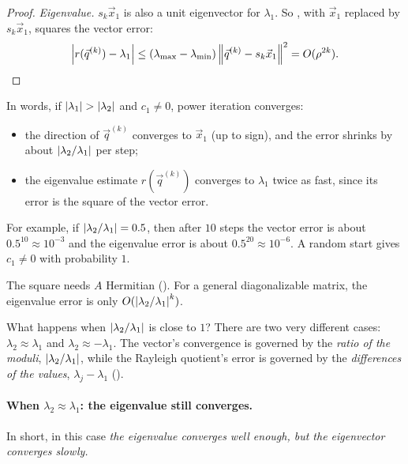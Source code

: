 \begin{proof}
  \emph{Eigenvalue.} $s_k\vec{x}_1$ is also a unit eigenvector for $\lambda_1$. So , with $\vec{x}_1$ replaced by $s_k\vec{x}_1$, squares the vector error:
  \begin{equation*}
    \left\lvert r(\vec{q}^{(k)}) - \lambda_1 \right\rvert \le (\lambda_{\max} - \lambda_{\min})\left\lVert \vec{q}^{(k)} - s_k\vec{x}_1 \right\rVert^2 = O(\rho^{2k}). \qedhere
  \end{equation*}
\end{proof}

In words, if $\left\lvert \lambda_1 \right\rvert > \left\lvert \lambda_2 \right\rvert$ and $c_1 \ne 0$, power iteration converges:
\begin{itemize}
  \item the direction of $\vec{q}^{(k)}$ converges to $\vec{x}_1$ (up to sign), and the error shrinks by about $\left\lvert \lambda_2/\lambda_1 \right\rvert$ per step;
  \item the eigenvalue estimate $r(\vec{q}^{(k)})$ converges to $\lambda_1$ twice as fast, since its error is the square of the vector error.
\end{itemize}
For example, if $\left\lvert \lambda_2/\lambda_1 \right\rvert = 0.5$, then after $10$ steps the vector error is about $0.5^{10} \approx 10^{-3}$ and the eigenvalue error is about $0.5^{20} \approx 10^{-6}$. A random start gives $c_1 \ne 0$ with probability $1$.

The square needs $A$ Hermitian (). For a general diagonalizable matrix, the eigenvalue error is only $O(\left\lvert \lambda_2/\lambda_1 \right\rvert^k)$.

What happens when $\left\lvert \lambda_2/\lambda_1 \right\rvert$ is close to $1$? There are two very different cases: $\lambda_2 \approx \lambda_1$ and $\lambda_2 \approx -\lambda_1$. The vector's convergence is governed by the \emph{ratio of the moduli}, $\left\lvert \lambda_2/\lambda_1 \right\rvert$, while the Rayleigh quotient's error is governed by the \emph{differences of the values}, $\lambda_j - \lambda_1$ ().

\paragraph{When \texorpdfstring{$\lambda_2 \approx \lambda_1$}{λ2 ≈ λ1}: the eigenvalue still converges.} In short, in this case \emph{the eigenvalue converges well enough, but the eigenvector converges slowly.}

